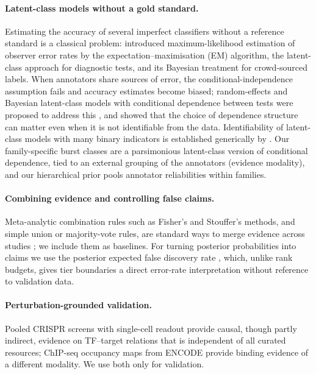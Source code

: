 \documentclass[11pt,a4paper]{article}
\begin{document}
\paragraph{Latent-class models without a gold standard.}
Estimating the accuracy of several imperfect classifiers without a reference standard is a classical problem: \citet{dawid1979maximum} introduced maximum-likelihood estimation of observer error rates by the expectation--maximisation (EM) algorithm, \citet{hui1980estimating} the latent-class approach for diagnostic tests, and \citet{raykar2010learning} its Bayesian treatment for crowd-sourced labels. When annotators share sources of error, the conditional-independence assumption fails and accuracy estimates become biased; random-effects and Bayesian latent-class models with conditional dependence between tests were proposed to address this \citep{qu1996random,dendukuri2001bayesian}, and \citet{albert2004cautionary} showed that the choice of dependence structure can matter even when it is not identifiable from the data. Identifiability of latent-class models with many binary indicators is established generically by \citet{allman2009identifiability}. Our family-specific burst classes are a parsimonious latent-class version of conditional dependence, tied to an external grouping of the annotators (evidence modality), and our hierarchical prior pools annotator reliabilities within families.

\paragraph{Combining evidence and controlling false claims.}
Meta-analytic combination rules such as Fisher's and Stouffer's methods, and simple union or majority-vote rules, are standard ways to merge evidence across studies \citep{tseng2012comprehensive}; we include them as baselines. For turning posterior probabilities into claims we use the posterior expected false discovery rate \citep{newton2004detecting}, which, unlike rank budgets, gives tier boundaries a direct error-rate interpretation without reference to validation data.

\paragraph{Perturbation-grounded validation.}
Pooled CRISPR screens with single-cell readout \citep{dixit2016perturb,adamson2016multiplexed,shifrut2018genome,norman2019exploring,papalexi2021characterizing,replogle2022mapping} provide causal, though partly indirect, evidence on TF--target relations that is independent of all curated resources; ChIP-seq occupancy maps from ENCODE \citep{encode2012integrated,gerstein2012architecture} provide binding evidence of a different modality. We use both only for validation.
\end{document}

